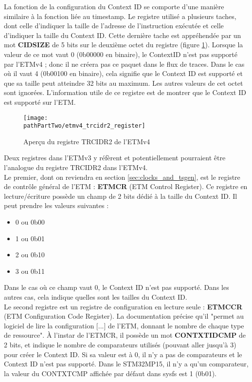 La fonction de la configuration du Context ID se comporte d'une manière
similaire à la fonction liée au timestamp. Le registre utilisé a plusieurs
taches, dont celle d'indiquer la taille de l'adresse de l'instruction exécutée
et celle d'indiquer la taille du Context ID. Cette dernière tache est
appréhendée par un mot \textbf{CIDSIZE} de 5 bits sur le deuxième octet du
registre (figure \ref{fig:etmv4_trcidr2_register}). Lorsque la valeur de ce
mot vaut 0 (0b00000 en binaire), le ContextID n'est pas supporté par l'ETMv4 ;
donc il ne créera pas ce paquet dans le flux de traces. Dans le cas où il vaut
4 (0b00100 en binaire), cela signifie que le Context ID est supporté et que sa
taille peut atteindre 32 bits au maximum. Les autres valeurs de cet octet sont
ignorées. L'information utile de ce registre est de montrer que le Context ID
est supporté sur l'ETM. 

\begin{figure}[H]
	\begin{center}
		\texttt{[image: \\pathPartTwo/etmv4\_trcidr2\_register]}
		\caption{Aperçu du registre TRCIDR2 de l'ETMv4}
	    \label{fig:etmv4_trcidr2_register}
	\end{center}
\end{figure}

Deux registres dans l'ETMv3 y réfèrent et potentiellement pourraient être
l'analogue du registre TRCIDR2 dans l'ETMv4. \\

Le premier, dont on reviendra en section \ref{sec:clocks_and_tsgen}, est le
registre de contrôle général de l'ETM : \textbf{ETMCR} (ETM Control Register).
Ce registre en lecture/écriture possède un champ de 2 bits dédié à la taille
du Context ID. Il peut prendre les valeurs suivantes :

\begin{itemize}[label=\textbullet]
	\item 0 ou 0b00
	\item 1 ou 0b01 
	\item 2 ou 0b10 
	\item 3 ou 0b11 
\end{itemize}

Dans le cas où ce champ vaut 0, le Context ID n'est pas supporté. Dans les
autres cas, cela indique quelles sont les tailles du Context ID. \\

Le second registre est un registre de configuration en lecture seule :
\textbf{ETMCCR} (ETM Configuration Code Register). La documentation précise
qu'il "permet au logiciel de lire la configuration [...] de l'ETM, donnant le
nombre de chaque type de ressource". À l'instar de l'ETMCR, il possède un mot
\textbf{CONTXTIDCMP} de 2 bits, et indique le nombre de comparateurs utilisés
(pouvant aller jusqu'à 3) pour créer le Context ID. Si sa valeur est à 0, il
n'y a pas de comparateurs et le Context ID n'est pas supporté. Dans le
STM32MP15, il n'y a qu'un comparateur, la valeur du CONTXTCMP affichée par
défaut dans sysfs est 1 (0b01).

